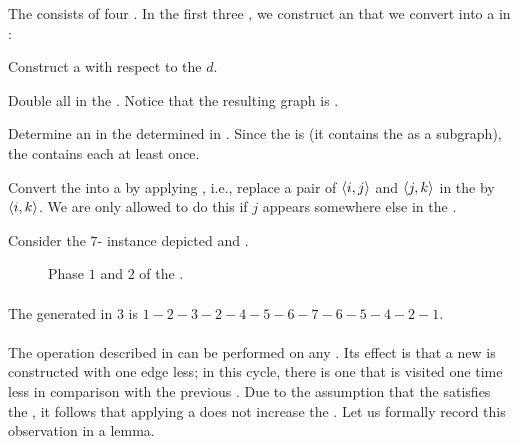 The  consists of four . In the first three , we construct an  that we convert into a  in :

\begin{phasenum}
 \item {} Construct a  with respect to the  $d$.
 \item {} Double all  in the . Notice that the resulting graph is .
 \item {} Determine an  in the  determined in . Since the  is  (it contains the  as a subgraph), the  contains each  at least once.
 \item {} Convert the  into a  by applying , i.e., replace a pair of  $\left\langle i,j \right\rangle$ and $\left\langle j, k \right\rangle$ in the  by $\left\langle i,k \right\rangle$. We are only allowed to do this if $j$ appears somewhere else in the .
\end{phasenum}

\begin{example}
Consider the $7$-  instance depicted  and .


\begin{figure}[hbt]
\centering
{}
\caption{Phase $1$ and $2$ of the .}
\end{figure}
\end{example}

\paragraph{}
The  generated in  $3$ is $1-2-3-2-4-5-6-7-6-5-4-2-1$.

\paragraph{}
The operation described in  can be performed on any . Its effect is that a new  is constructed with one edge less; in this cycle, there is one  that is visited one time less in comparison with the previous . Due to the assumption that the  satisfies the , it follows that applying a  does not increase the . Let us formally record this observation in a lemma.


